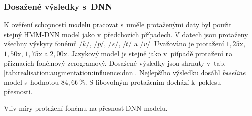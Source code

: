 
\subsubsection{Dosažené výsledky s~DNN}

K ověření schopností modelu pracovat s~uměle protaženými daty byl použit stejný HMM-DNN model jako v~předchozích případech.
V datech jsou protaženy všechny výskyty fonémů $/k/$, $/p/$, $/s/$, $/t/$ a $/v/$. Uvažováno je protažení $1,25\mathrm{x}$, $1,50\mathrm{x}$, $1,75\mathrm{x}$ a $2,00\mathrm{x}$. Jazykový model je stejně jako v~případě protažení na příznacích fonémový zerogramový.
Dosažené výsledky jsou shrnuty v~tab. \ref{tab:realisation:augmentation:influence:dnn}.
Nejlepšího výsledku dosáhl \textit{baseline} model s~hodnotou $84,66~\%$.
S libovolným protažením dochází  k~poklesu přesnosti.

\begin{table}[htpb]
  \centering
  \def\arraystretch{1.5}
  \caption{Vliv míry protažení fonému na přesnost DNN modelu.}
  \label{tab:realisation:augmentation:influence:dnn}
\end{table}


